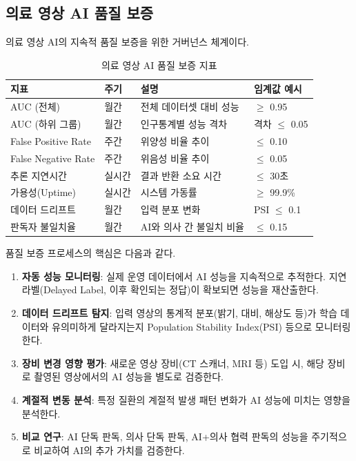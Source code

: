 \subsection{의료 영상 AI 품질 보증}

의료 영상 AI의 지속적 품질 보증을 위한 거버넌스 체계이다.

\begin{table}[htbp]
\centering
\caption{의료 영상 AI 품질 보증 지표}
\label{tab:16_qa_metrics}
\begin{tabularx}{\textwidth}{p{3cm}p{2cm}Xp{2.5cm}}
\toprule
\textbf{지표} & \textbf{주기} & \textbf{설명} & \textbf{임계값 예시} \\
\midrule
AUC (전체) & 월간 & 전체 데이터셋 대비 성능 & $\geq$ 0.95 \\
AUC (하위 그룹) & 월간 & 인구통계별 성능 격차 & 격차 $\leq$ 0.05 \\
False Positive Rate & 주간 & 위양성 비율 추이 & $\leq$ 0.10 \\
False Negative Rate & 주간 & 위음성 비율 추이 & $\leq$ 0.05 \\
추론 지연시간 & 실시간 & 결과 반환 소요 시간 & $\leq$ 30초 \\
가용성(Uptime) & 실시간 & 시스템 가동률 & $\geq$ 99.9\% \\
데이터 드리프트 & 월간 & 입력 분포 변화 & PSI $\leq$ 0.1 \\
판독자 불일치율 & 월간 & AI와 의사 간 불일치 비율 & $\leq$ 0.15 \\
\bottomrule
\end{tabularx}
\end{table}

품질 보증 프로세스의 핵심은 다음과 같다.

\begin{enumerate}
 \item \textbf{자동 성능 모니터링}: 실제 운영 데이터에서 AI 성능을 지속적으로 추적한다. 지연 라벨(Delayed Label, 이후 확인되는 정답)이 확보되면 성능을 재산출한다.
 \item \textbf{데이터 드리프트 탐지}: 입력 영상의 통계적 분포(밝기, 대비, 해상도 등)가 학습 데이터와 유의미하게 달라지는지 Population Stability Index(PSI) 등으로 모니터링한다.
 \item \textbf{장비 변경 영향 평가}: 새로운 영상 장비(CT 스캐너, MRI 등) 도입 시, 해당 장비로 촬영된 영상에서의 AI 성능을 별도로 검증한다.
 \item \textbf{계절적 변동 분석}: 특정 질환의 계절적 발생 패턴 변화가 AI 성능에 미치는 영향을 분석한다.
 \item \textbf{비교 연구}: AI 단독 판독, 의사 단독 판독, AI+의사 협력 판독의 성능을 주기적으로 비교하여 AI의 추가 가치를 검증한다.
\end{enumerate}

